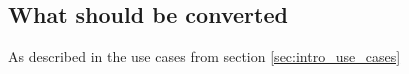 \subsection{What should be converted}
As described in the use cases from section \ref{sec:intro_use_cases}


